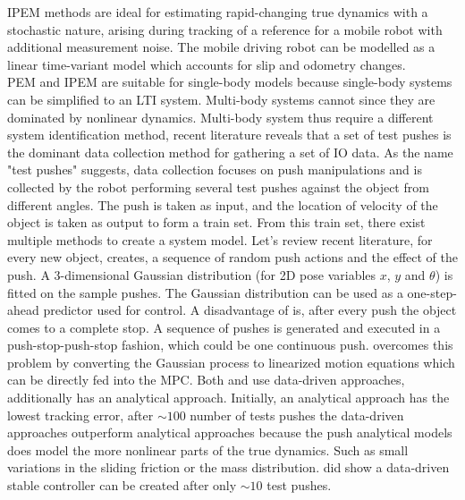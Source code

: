 \ac{IPEM} methods are ideal for estimating rapid-changing true dynamics with a stochastic nature, arising during tracking of a reference for a mobile robot with additional measurement noise. The mobile driving robot can be modelled as a linear time-variant model which accounts for slip and odometry changes.\\

\ac{PEM} and \ac{IPEM} are suitable for single-body models because single-body systems can be simplified to an \ac{LTI} system. Multi-body systems cannot since they are dominated by nonlinear dynamics. Multi-body system thus require a different system identification method, recent literature reveals that a set of test pushes is the dominant data collection method for gathering a set of \ac{IO} data. As the name "test pushes" suggests, data collection focuses on push manipulations and is collected by the robot performing several test pushes against the object from different angles. The push is taken as input, and the location of velocity of the object is taken as output to form a train set. From this train set, there exist multiple methods to create a system model. Let's review recent literature,  for every new object, \cite{mericli_push-manipulation_2015} creates, a sequence of random push actions and the effect of the push. A 3-dimensional Gaussian distribution (for 2D pose variables $x$, $y$ and $\theta$) is fitted on the sample pushes. The Gaussian distribution can be used as a one-step-ahead predictor used for control. A disadvantage of \cite{mericli_push-manipulation_2015} is, after every push the object comes to a complete stop. A sequence of pushes is generated and executed in a push-stop-push-stop fashion, which could be one continuous push. \cite{bauza_data-efficient_2018} overcomes this problem by converting the Gaussian process to linearized motion equations which can be directly fed into the \ac{MPC}. Both \cite{mericli_push-manipulation_2015} and \cite{bauza_data-efficient_2018} use data-driven approaches, \cite{bauza_data-efficient_2018} additionally has an analytical approach. Initially, an analytical approach has the lowest tracking error, after $\sim 100$ number of tests pushes the data-driven approaches outperform analytical approaches because the push analytical models does model the more nonlinear parts of the true dynamics. Such as small variations in the sliding friction or the mass distribution. \cite{bauza_data-efficient_2018} did show a data-driven stable controller can be created after only $\sim 10$ test pushes. \\  

